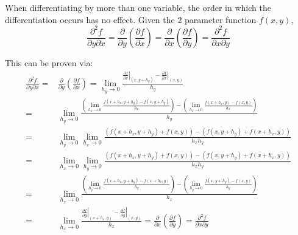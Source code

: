 \documentclass{article}
\begin{document}
\vspace{5mm}

When differentiating by more than one variable, the order in which the differentiation occurs has no effect. Given the \(2\) parameter function \(f(x, y)\), 
\[\frac{\partial^2 f}{\partial y \partial x} = \frac{\partial}{\partial y}\left(\frac{\partial f}{\partial x}\right) = \frac{\partial}{\partial x}\left(\frac{\partial f}{\partial y}\right) = \frac{\partial^2 f}{\partial x \partial y}\]

This can be proven via:
\begin{align*}
\frac{\partial^2 f}{\partial y \partial x} 
= & \frac{\partial}{\partial y}\left(\frac{\partial f}{\partial x}\right) 
= \lim_{h_y \rightarrow 0} \frac{\left.\frac{\partial f}{\partial x}\right|_{(x, y + h_y)} - \left.\frac{\partial f}{\partial x}\right|_{(x, y)}}{h_y} \\  
= & \lim_{h_y \rightarrow 0} \frac{\left(\lim_{h_x \rightarrow 0} \frac{f(x + h_x, y + h_y) - f(x, y + h_y)}{h_x}\right) - \left(\lim_{h_x \rightarrow 0} \frac{f(x + h_x, y) - f(x, y)}{h_x}\right)}{h_y} \\    
= & \lim_{h_y \rightarrow 0} \lim_{h_x \rightarrow 0} \frac{(f(x + h_x, y + h_y) + f(x, y)) - (f(x, y + h_y) + f(x + h_x, y))}{h_x h_y} \\    
= & \lim_{h_x \rightarrow 0} \lim_{h_y \rightarrow 0} \frac{(f(x + h_x, y + h_y) + f(x, y)) - (f(x, y + h_y) + f(x + h_x, y))}{h_x h_y} \\  
= & \lim_{h_x \rightarrow 0} \frac{\left(\lim_{h_y \rightarrow 0} \frac{f(x + h_x, y + h_y) - f(x + h_x, y)}{h_y}\right) - \left(\lim_{h_y \rightarrow 0} \frac{f(x, y + h_y) - f(x, y)}{h_y}\right)}{h_x} \\    
= & \lim_{h_x \rightarrow 0} \frac{\left.\frac{\partial f}{\partial y}\right|_{(x + h_x, y)} - \left.\frac{\partial f}{\partial y}\right|_{(x, y)}}{h_x}   
= \frac{\partial}{\partial x}\left(\frac{\partial f}{\partial y}\right)   
= \frac{\partial^2 f}{\partial x \partial y}
\end{align*}
\end{document}
